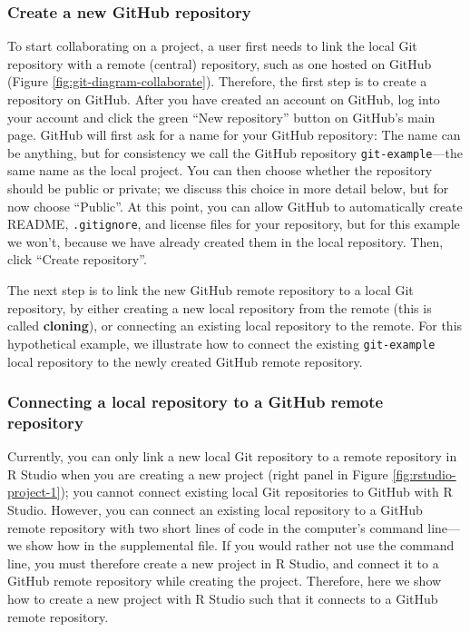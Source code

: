 \documentclass[
  american,
  ,doc,floatsintext]{apa6}
\begin{document}
\hypertarget{create-a-new-github-repository}{%
\subsubsection{Create a new GitHub repository}\label{create-a-new-github-repository}}

To start collaborating on a project, a user first needs to link the local Git repository with a remote (central) repository, such as one hosted on GitHub (Figure \ref{fig:git-diagram-collaborate}). Therefore, the first step is to create a repository on GitHub. After you have created an account on GitHub, log into your account and click the green \enquote{New repository} button on GitHub's main page. GitHub will first ask for a name for your GitHub repository: The name can be anything, but for consistency we call the GitHub repository \texttt{git-example}---the same name as the local project. You can then choose whether the repository should be public or private; we discuss this choice in more detail below, but for now choose \enquote{Public}. At this point, you can allow GitHub to automatically create README, \texttt{.gitignore}, and license files for your repository, but for this example we won't, because we have already created them in the local repository. Then, click \enquote{Create repository}.

The next step is to link the new GitHub remote repository to a local Git repository, by either creating a new local repository from the remote (this is called \textbf{cloning}), or connecting an existing local repository to the remote. For this hypothetical example, we illustrate how to connect the existing \texttt{git-example} local repository to the newly created GitHub remote repository.

\hypertarget{connecting-a-local-repository-to-a-github-remote-repository}{%
\subsubsection{Connecting a local repository to a GitHub remote repository}\label{connecting-a-local-repository-to-a-github-remote-repository}}

Currently, you can only link a new local Git repository to a remote repository in R Studio when you are creating a new project (right panel in Figure \ref{fig:rstudio-project-1}); you cannot connect existing local Git repositories to GitHub with R Studio. However, you can connect an existing local repository to a GitHub remote repository with two short lines of code in the computer's command line---we show how in the supplemental file. If you would rather not use the command line, you must therefore create a new project in R Studio, and connect it to a GitHub remote repository while creating the project. Therefore, here we show how to create a new project with R Studio such that it connects to a GitHub remote repository.
\end{document}
